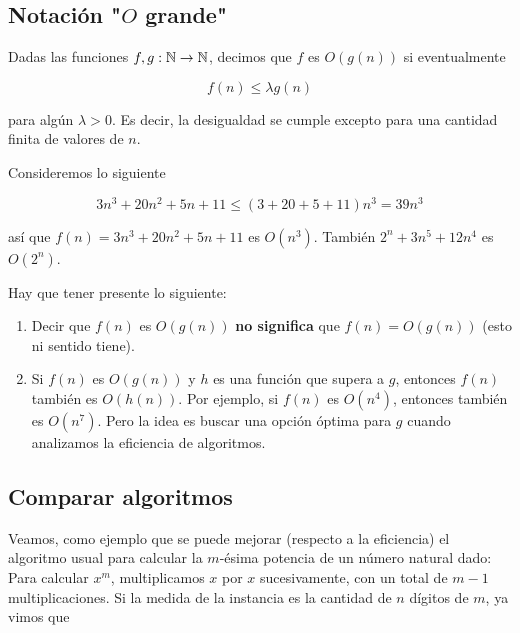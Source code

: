 \subsection{Notación "$O$ grande"}

\begin{defn}    
    Dadas las funciones $f, g: \mathbb{N} \rightarrow \mathbb{N}$, decimos que $f$ es \ul{$O(g(n))$} si eventualmente
    
    \[
    f(n) \leq \lambda g(n)
    \]
    
    \noindent para algún $\lambda > 0$. Es decir, la desigualdad se cumple excepto para una cantidad finita de valores de $n$.
\end{defn}

\begin{ejem}
    Consideremos lo siguiente
    
    \[
    3n^3 + 20n^2 + 5n + 11 \leq (3 + 20 + 5 + 11)n^3 = 39n^3
    \]
    
    \noindent así que $f(n) = 3n^3 + 20n^2 + 5n + 11$ es $O(n^3)$. También $2^n + 3n^5 + 12n^4$ es $O(2^n)$.
\end{ejem}

\begin{nota} 
    Hay que tener presente lo siguiente:
    
    \begin{enumerate}
        \item Decir que $f(n)$ es $O(g(n))$ \textbf{no significa} que $f(n) = O(g(n))$ (esto ni sentido tiene).
        \item Si $f(n)$ es $O(g(n))$ y $h$ es una función que supera a $g$, entonces $f(n)$ también es $O(h(n))$. Por ejemplo, si $f(n)$ es $O(n^4)$, entonces también es $O(n^7)$. Pero la idea es buscar una opción óptima para $g$ cuando analizamos la eficiencia de algoritmos.
    \end{enumerate}
\end{nota}

\subsection{Comparar algoritmos}

Veamos, como ejemplo que se puede mejorar (respecto a la eficiencia) el algoritmo usual para calcular la $m$-ésima potencia de un número natural dado: Para calcular $x^m$, multiplicamos $x$ por $x$ sucesivamente, con un total de $m-1$ multiplicaciones. Si la medida de la instancia es la cantidad de $n$ dígitos de $m$, ya vimos que

